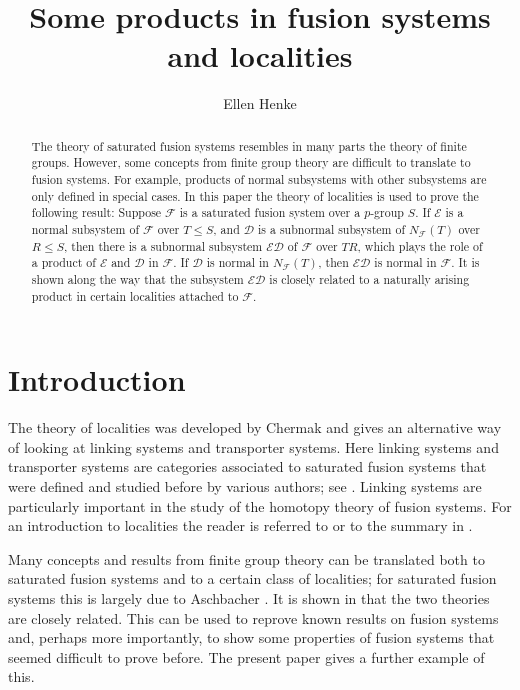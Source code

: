 \documentclass[reqno,11pt]{amsart}
\title[Some products in fusion systems and localities]{Some products in fusion systems and localities}
\author[E.~Henke]{Ellen Henke}
\numberwithin{equation}{section}
\theoremstyle{definition}
\newcommand{\F}{\mathcal{F}}
\newcommand{\E}{\mathcal{E}}
\newcommand{\mD}{\mathcal{D}}
\begin{document}
\begin{abstract}
The theory of saturated fusion systems resembles in many parts the theory of finite groups. However, some concepts from finite group theory are difficult to translate to fusion systems. For example, products of normal subsystems with other subsystems are only defined in special cases. In this paper the theory of localities is used to prove the following result: Suppose $\F$ is a saturated fusion system over a $p$-group $S$. If $\E$ is a normal subsystem of $\F$ over $T\leq S$, and $\mD$ is a subnormal subsystem of $N_\F(T)$ over $R\leq S$, then there is a subnormal subsystem $\E\mD$ of $\F$ over $TR$, which plays the role of a product of $\E$ and $\mD$ in $\F$. If $\mD$ is normal in $N_\F(T)$, then $\E\mD$ is normal in $\F$. It is shown along the way that the subsystem $\E\mD$ is closely related to a naturally arising product in certain localities attached to $\F$.
\end{abstract}

\maketitle


\section{Introduction}

The theory of localities was developed by Chermak \cite{Chermak:2013, Chermak:2015} and gives an alternative way of looking at linking systems and transporter systems. Here linking systems and transporter systems are categories associated to saturated fusion systems that were defined and studied before by various authors; see \cite{BLO2,BCGLO1,O4,OV1}. Linking systems are particularly important in the study of the homotopy theory of fusion systems. For an introduction to localities the reader is referred to \cite{Chermak:2015} or to the summary in \cite[Sections~3.1-3.5 and 3.7]{Henke:Regular}.

\smallskip

Many concepts and results from finite group theory can be translated both to saturated fusion systems and to a certain class of localities; for saturated fusion systems this is largely due to Aschbacher \cite{Aschbacher:2008, Aschbacher:2011}. It is shown in \cite{Chermak/Henke} that the two theories are closely related. This can be used to reprove known results on fusion systems and, perhaps more importantly, to show some properties of fusion systems that seemed difficult to prove before. The present paper gives a further example of this. 
\end{document}
